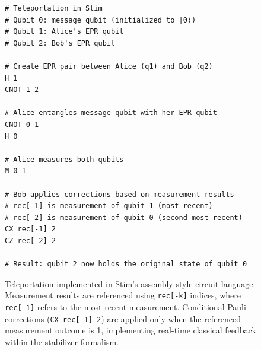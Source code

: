 \begin{figure}[t]
\begin{verbatim}
# Teleportation in Stim
# Qubit 0: message qubit (initialized to |0⟩)
# Qubit 1: Alice's EPR qubit
# Qubit 2: Bob's EPR qubit

# Create EPR pair between Alice (q1) and Bob (q2)
H 1
CNOT 1 2

# Alice entangles message qubit with her EPR qubit
CNOT 0 1
H 0

# Alice measures both qubits
M 0 1

# Bob applies corrections based on measurement results
# rec[-1] is measurement of qubit 1 (most recent)
# rec[-2] is measurement of qubit 0 (second most recent)
CX rec[-1] 2
CZ rec[-2] 2

# Result: qubit 2 now holds the original state of qubit 0
\end{verbatim}
\caption{Teleportation implemented in Stim's assembly-style circuit language. Measurement results are referenced using \texttt{rec[-k]} indices, where \texttt{rec[-1]} refers to the most recent measurement. Conditional Pauli corrections (\texttt{CX rec[-1] 2}) are applied only when the referenced measurement outcome is 1, implementing real-time classical feedback within the stabilizer formalism.}
\label{fig:stim-teleport}
\end{figure}
